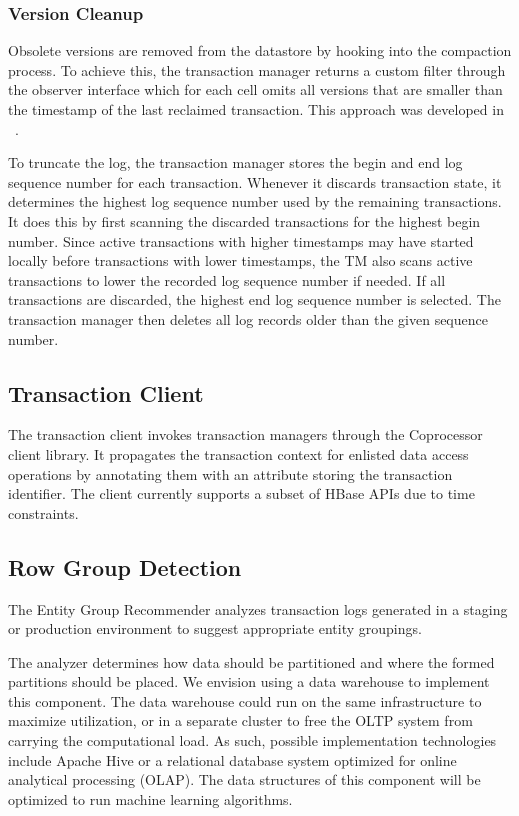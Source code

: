 \documentclass[10pt,final,journal]{IEEEtran}
\begin{document}
 \subsubsection{Version Cleanup}
Obsolete versions are removed from the datastore by hooking into the compaction process. To achieve this, the transaction manager returns a custom filter through the observer interface which for each cell omits all versions that are smaller than the timestamp of the last reclaimed transaction. This approach was developed in ~\cite{Junqueira:2011:LTS:2056318.2057148}.

To truncate the log, the transaction manager stores the begin and end log sequence number for each transaction. Whenever it discards transaction state, it determines the highest log sequence number used by the remaining transactions. It does this by first scanning the discarded transactions for the highest begin number. Since active transactions with higher timestamps may have started locally before transactions with lower timestamps, the TM also scans active transactions to lower the recorded log sequence number if needed. If all transactions are discarded, the highest end log sequence number is selected. The transaction manager then deletes all log records older than the given sequence number.

\subsection{Transaction Client}
The transaction client invokes transaction managers through the Coprocessor client library. It propagates the transaction context for enlisted data access operations by annotating them with an attribute storing the transaction identifier. The client currently supports a subset of HBase APIs due to time constraints.

\subsection{Row Group Detection}
The Entity Group Recommender analyzes transaction logs generated in a staging or production environment to suggest appropriate entity groupings.

The analyzer determines how data should be partitioned and where the formed partitions should be placed. We envision using a data warehouse to implement this component. The data warehouse could run on the same infrastructure to maximize utilization, or in a separate cluster to free the OLTP system from carrying the computational load. As such, possible implementation technologies include Apache Hive or a relational database system optimized for online analytical processing (OLAP). The data structures of this component will be optimized to run machine learning algorithms.
\end{document}
